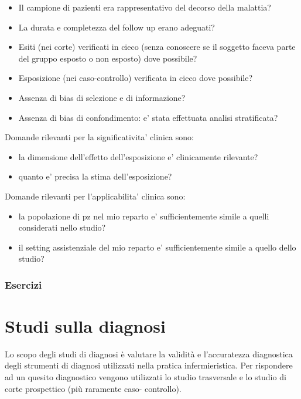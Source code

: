 \documentclass[]{book}
\begin{document}
\begin{itemize}
\item
  Il campione di pazienti era rappresentativo del decorso della malattia?
\item
  La durata e completezza del follow up erano adeguati?
\item
  Esiti (nei corte) verificati in cieco (senza conoscere se il soggetto faceva parte del gruppo esposto o non esposto) dove possibile?
\item
  Esposizione (nei caso-controllo) verificata in cieco dove possibile?
\item
  Assenza di bias di selezione e di informazione?
\item
  Assenza di bias di confondimento: e' stata effettuata analisi stratificata?
\end{itemize}

Domande rilevanti per la significativita' clinica sono:

\begin{itemize}
\item
  la dimensione dell'effetto dell'esposizione e' clinicamente rilevante?
\item
  quanto e' precisa la stima dell'esposizione?
\end{itemize}

Domande rilevanti per l'applicabilita' clinica sono:

\begin{itemize}
\item
  la popolazione di pz nel mio reparto e' sufficientemente simile a quelli considerati nello studio?
\item
  il setting assistenziale del mio reparto e' sufficientemente simile a quello dello studio?
\end{itemize}

\hypertarget{esercizi-3}{%
\subsection{Esercizi}\label{esercizi-3}}

\hypertarget{studi-sulla-diagnosi}{%
\chapter{Studi sulla diagnosi}\label{studi-sulla-diagnosi}}

Lo scopo degli studi di diagnosi è valutare la validità e l'accuratezza diagnostica degli strumenti di diagnosi utilizzati nella pratica infermieristica.
Per rispondere ad un quesito diagnostico vengono utilizzati lo studio trasversale e lo studio di corte prospettico (più raramente caso- controllo).
\end{document}

